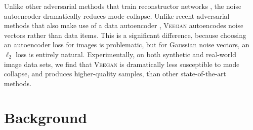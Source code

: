 \documentclass{article}
\newcommand{\acronym}{\textsc{Veegan}\xspace}
\newcommand{\comment}[1]{} %
\newcommand{\AS}[1]{\comment{\textcolor{BrickRed}{\textit{\lbrack AS: #1 \rbrack}}}}
\newcommand{\MG}[1]{\comment{\textcolor{Orange}{\textit{\lbrack MG: #1 \rbrack}}}}
\begin{document}

Unlike other  adversarial methods that  train reconstructor networks \citep{donahue2016adversarial,ali2016,tran17dim},
the noise autoencoder dramatically reduces mode collapse.
Unlike recent adversarial methods that also make use of a data autoencoder \cite{larsen2015autoencoding,Che2017ModeRG,makhzani2015adversarial},
\acronym autoencodes noise vectors
rather than data items. This is a significant difference,
because choosing an autoencoder loss for images is problematic,
but for Gaussian noise vectors, an $\ell_2$ loss is entirely 
natural.
Experimentally, on both synthetic and real-world image data sets, we find that \acronym is dramatically less susceptible to mode collapse, and produces higher-quality samples, than other
state-of-the-art methods. 


\section{Background}
\end{document}
